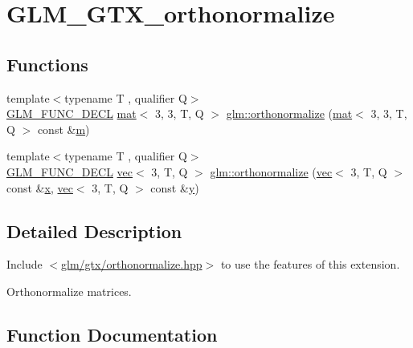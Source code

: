 \hypertarget{group__gtx__orthonormalize}{}\section{G\+L\+M\+\_\+\+G\+T\+X\+\_\+orthonormalize}
\label{group__gtx__orthonormalize}
\subsection*{Functions}
\begin{DoxyCompactItemize}
\item 
{\footnotesize template$<$typename T , qualifier Q$>$ }\\\hyperlink{setup_8hpp_ab2d052de21a70539923e9bcbf6e83a51}{G\+L\+M\+\_\+\+F\+U\+N\+C\+\_\+\+D\+E\+CL} \hyperlink{structglm_1_1mat}{mat}$<$ 3, 3, T, Q $>$ \hyperlink{group__gtx__orthonormalize_ga4cab5d698e6e2eccea30c8e81c74371f}{glm\+::orthonormalize} (\hyperlink{structglm_1_1mat}{mat}$<$ 3, 3, T, Q $>$ const \&\hyperlink{_s_d_l__opengl__glext_8h_af593500c283bf1a787a6f947f503a5c2}{m})
\item 
{\footnotesize template$<$typename T , qualifier Q$>$ }\\\hyperlink{setup_8hpp_ab2d052de21a70539923e9bcbf6e83a51}{G\+L\+M\+\_\+\+F\+U\+N\+C\+\_\+\+D\+E\+CL} \hyperlink{structglm_1_1vec}{vec}$<$ 3, T, Q $>$ \hyperlink{group__gtx__orthonormalize_gac3bc7ef498815026bc3d361ae0b7138e}{glm\+::orthonormalize} (\hyperlink{structglm_1_1vec}{vec}$<$ 3, T, Q $>$ const \&\hyperlink{_s_d_l__opengl_8h_ad0e63d0edcdbd3d79554076bf309fd47}{x}, \hyperlink{structglm_1_1vec}{vec}$<$ 3, T, Q $>$ const \&\hyperlink{_s_d_l__opengl_8h_a1675d9d7bb68e1657ff028643b4037e3}{y})
\end{DoxyCompactItemize}


\subsection{Detailed Description}
Include $<$\hyperlink{orthonormalize_8hpp}{glm/gtx/orthonormalize.\+hpp}$>$ to use the features of this extension.

Orthonormalize matrices. 

\subsection{Function Documentation}
\mbox{\label{group__gtx__orthonormalize_ga4cab5d698e6e2eccea30c8e81c74371f}} 
